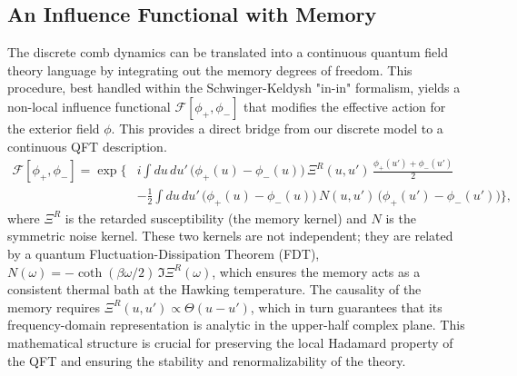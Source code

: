 \documentclass[11pt,a4paper]{article}
\theoremstyle{plain}
\theoremstyle{definition}
\theoremstyle{remark}
\begin{document}

\subsection{An Influence Functional with Memory}
\label{sec:influence}
The discrete comb dynamics can be translated into a continuous quantum field theory language by integrating out the memory degrees of freedom. This procedure, best handled within the Schwinger-Keldysh "in-in" formalism, yields a non-local influence functional $\mathcal{F}[\phi_+, \phi_-]$ that modifies the effective action for the exterior field $\phi$. This provides a direct bridge from our discrete model to a continuous QFT description.
\begin{align}
    \mathcal{F}[\phi_+, \phi_-]=\exp\Bigg\{ & i\!\int \!du\,du'\,\big(\phi_+(u)-\phi_-(u)\big)\,\Xi^R(u, u')\,\frac{\phi_+(u')+\phi_-(u')}{2} \nonumber \\
    & - \frac{1}{2}\!\int \!du\,du'\,\big(\phi_+(u)-\phi_-(u)\big)\,N(u,u')\,\big(\phi_+(u')-\phi_-(u')\big) \Bigg\},
    \label{eq:influence_functional}
\end{align}
where $\Xi^R$ is the retarded susceptibility (the memory kernel) and $N$ is the symmetric noise kernel. These two kernels are not independent; they are related by a quantum Fluctuation-Dissipation Theorem (FDT), $N(\omega)= - \coth(\beta \omega/2)\,\Im \Xi^R(\omega)$, which ensures the memory acts as a consistent thermal bath at the Hawking temperature. The causality of the memory requires $\Xi^R(u,u') \propto \Theta(u-u')$, which in turn guarantees that its frequency-domain representation is analytic in the upper-half complex plane. This mathematical structure is crucial for preserving the local Hadamard property of the QFT and ensuring the stability and renormalizability of the theory.
\end{document}
